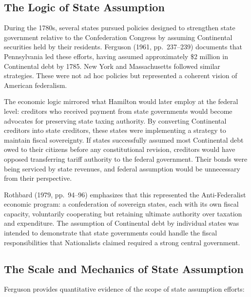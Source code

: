 \documentclass[12pt]{article}
\begin{document}
\subsection{The Logic of State Assumption}

During the 1780s, several states pursued policies designed to strengthen state government relative to the Confederation Congress by assuming Continental securities held by their residents. Ferguson (1961, pp.~237--239) documents that Pennsylvania led these efforts, having assumed approximately \$2 million in Continental debt by 1785. New York and Massachusetts followed similar strategies. These were not ad hoc policies but represented a coherent vision of American federalism.

The economic logic mirrored what Hamilton would later employ at the federal level: creditors who received payment from state governments would become advocates for preserving state taxing authority. By converting Continental creditors into state creditors, these states were implementing a strategy to maintain fiscal sovereignty. If states successfully assumed most Continental debt owed to their citizens before any constitutional revision, creditors would have opposed transferring tariff authority to the federal government. Their bonds were being serviced by state revenues, and federal assumption would be unnecessary from their perspective.

Rothbard (1979, pp.~94--96) emphasizes that this represented the Anti-Federalist economic program: a confederation of sovereign states, each with its own fiscal capacity, voluntarily cooperating but retaining ultimate authority over taxation and expenditure. The assumption of Continental debt by individual states was intended to demonstrate that state governments could handle the fiscal responsibilities that Nationalists claimed required a strong central government.

\subsection{The Scale and Mechanics of State Assumption}

Ferguson provides quantitative evidence of the scope of state assumption efforts:
\end{document}
